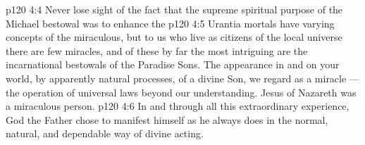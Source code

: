 \vs p120 4:4 Never lose sight of the fact that the supreme spiritual purpose of the Michael bestowal was to enhance the 
\vs p120 4:5 \pc Urantia mortals have varying concepts of the miraculous, but to us who live as citizens of the local universe there are few miracles, and of these by far the most intriguing are the incarnational bestowals of the Paradise Sons. The appearance in and on your world, by apparently natural processes, of a divine Son, we regard as a miracle --- the operation of universal laws beyond our understanding. Jesus of Nazareth was a miraculous person.
\vs p120 4:6 In and through all this extraordinary experience, God the Father chose to manifest himself as he always does  in the normal, natural, and dependable way of divine acting.
